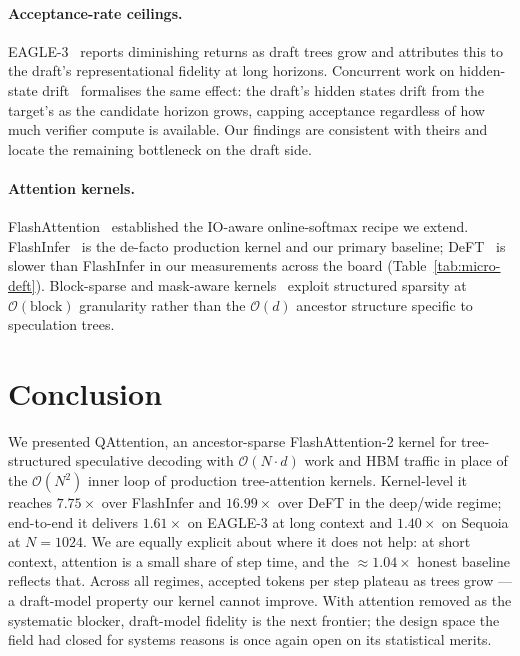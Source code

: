 \documentclass{article}
\newcommand{\method}{QAttention}
\newcommand{\bigO}[1]{\mathcal{O}(#1)}
\newcommand{\numtokens}{N}
\newcommand{\depth}{d}
\begin{document}
\paragraph{Acceptance-rate ceilings.}
EAGLE-3~\cite{li2025eagle3} reports diminishing returns as draft trees
grow and attributes this to the draft's representational fidelity at
long horizons. Concurrent work on hidden-state
drift~\cite{drift2026} formalises the same effect: the
draft's hidden states drift from the target's as the candidate horizon
grows, capping acceptance regardless of how much verifier compute is
available. Our findings are consistent with theirs and locate the
remaining bottleneck on the draft side.

\paragraph{Attention kernels.}
FlashAttention~\cite{dao2022flashattention,dao2023flashattention2}
established the IO-aware online-softmax recipe we extend.
FlashInfer~\cite{ye2025flashinfer} is the de-facto production kernel
and our primary baseline; DeFT~\cite{yao2024deft} is slower than FlashInfer in our measurements across the board
(Table~\ref{tab:micro-deft}).
Block-sparse and mask-aware kernels~\cite{xformers2022,gao2024seerattention}
exploit structured sparsity at $\bigO{\text{block}}$ granularity rather
than the $\bigO{\depth}$ ancestor structure specific to speculation
trees.

\section{Conclusion}
\label{sec:conclusion}

We presented \method{}, an ancestor-sparse FlashAttention-2 kernel for
tree-structured speculative decoding with
$\bigO{\numtokens \!\cdot\! \depth}$ work and HBM traffic in place of
the $\bigO{\numtokens^2}$ inner loop of production tree-attention
kernels. Kernel-level it reaches $7.75\times$ over FlashInfer and
$16.99\times$ over DeFT in the deep/wide regime; end-to-end it
delivers $1.61\times$ on EAGLE-3 at long context and $1.40\times$ on
Sequoia at $\numtokens{=}1024$. We are equally explicit about where it
does not help: at short context, attention is a small share of step
time, and the $\approx\!1.04\times$ honest baseline reflects that.
Across all regimes, accepted tokens per step plateau as trees grow ---
a draft-model property our kernel cannot improve. With attention
removed as the systematic blocker, draft-model fidelity is the next
frontier; the design space the field had closed for systems reasons is
once again open on its statistical merits.
\end{document}
